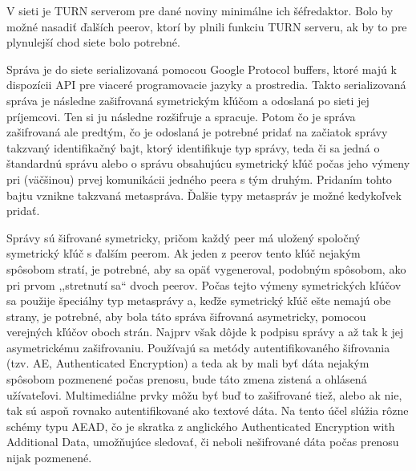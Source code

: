 V \npps{} sieti je TURN serverom pre dané noviny minimálne ich šéfredaktor. Bolo by možné nasadiť ďalších \npps{} peerov, ktorí by plnili funkciu TURN serveru, ak by to pre plynulejší chod siete bolo potrebné. 

Správa je do siete serializovaná pomocou Google Protocol buffers, ktoré majú k dispozícii API pre viaceré programovacie jazyky a prostredia. Takto serializovaná správa je následne zašifrovaná symetrickým kľúčom a odoslaná po sieti jej príjemcovi. Ten si ju následne rozšifruje a spracuje. Potom čo je správa zašifrovaná ale predtým, čo je odoslaná je potrebné pridať na začiatok správy takzvaný identifikačný bajt, ktorý identifikuje typ správy, teda či sa jedná o štandardnú správu alebo o správu obsahujúcu symetrický kľúč počas jeho výmeny pri (väčšinou) prvej komunikácii jedného peera s tým druhým. Pridaním tohto bajtu vznikne takzvaná metaspráva. Ďalšie typy metaspráv je možné kedykoľvek pridať. 

Správy sú šifrované symetricky, pričom každý peer má uložený spoločný symetrický kľúč s ďalším peerom. Ak jeden z peerov tento kľúč nejakým spôsobom stratí, je potrebné, aby sa opäť vygeneroval, podobným spôsobom, ako pri prvom ,,stretnutí sa`` dvoch peerov. Počas tejto výmeny symetrických kľúčov sa použije špeciálny typ metasprávy a, keďže symetrický kľúč ešte nemajú obe strany, je potrebné, aby bola táto správa šifrovaná asymetricky, pomocou verejných kľúčov oboch strán. Najprv však dôjde k podpisu správy a až tak k jej asymetrickému zašifrovaniu. Používajú sa metódy autentifikovaného šifrovania (tzv. AE, Authenticated Encryption) a teda ak by mali byť dáta nejakým spôsobom pozmenené počas prenosu, bude táto zmena zistená a ohlásená užívateľovi. Multimediálne prvky môžu byť buď to zašifrované tiež, alebo ak nie, tak sú aspoň rovnako autentifikované ako textové dáta. Na tento účel slúžia rôzne schémy typu AEAD, čo je skratka z anglického Authenticated Encryption with Additional Data, umožňujúce sledovať, či neboli nešifrované dáta počas prenosu nijak pozmenené. 

